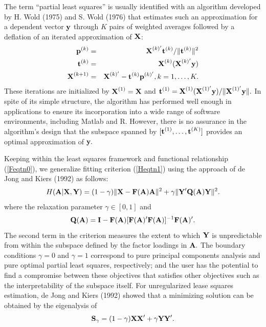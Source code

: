 \documentclass[12pt]{article}
\begin{document}
The term ``partial least squares'' is usually identified with an algorithm developed by H. Wold (1975) and S. Wold (1976) that estimates such an approximation for a dependent vector $\mbox{\bf y}$ through $K$ pairs of weighted averages followed by a deflation of an iterated approximation of $\mbox{\bf X}$:
\begin{eqnarray} \label{PLSeqtns}
  \mbox{\bf p}^{(k)}   & = & \mbox{\bf X}^{(k)'} \mbox{\bf t}^{(k)} / \|\mbox{\bf t}^{(k)}\|^2 \nonumber \\
  \mbox{\bf t}^{(k)}   & = & \mbox{\bf X}^{(k)} (\mbox{\bf X}^{(k)'} \mbox{\bf y})             \nonumber \\
  \mbox{\bf X}^{(k+1)} & = & \mbox{\bf X}^{(k)'} - \mbox{\bf t}^{(k)} \mbox{\bf p}^{(k)'}, k=1, \ldots, K.
\end{eqnarray}
These iterations are initialized by $\mbox{\bf X}^{(1)} = \mbox{\bf X}$ and $\mbox{\bf t}^{(1)} = \mbox{\bf X}^{(1)} (\mbox{\bf X}^{(1)'} \mbox{\bf y}) / \|\mbox{\bf X}^{(1)'}\mbox{\bf y} \|.$  In spite of its simple structure, the algorithm has performed well enough in applications to ensure its incorporation into a wide range of software environments, including Matlab and R.  However, there is no assurance in the algorithm's design that the subspace spanned by $[\mbox{\bf t}^{(1)}, \ldots, \mbox{\bf t}^{(K)}]$ provides an optimal approximation of $\mbox{\bf y}.$

Keeping within the least squares framework and functional relationship (\ref{Feqtn0}), we generalize fitting criterion (\ref{Heqtn1}) using the approach of de Jong and Kiers (1992) as follows:
\begin{equation} \label{HPLSeqtn}
  H(\mbox{\bf A}|\mbox{\bf X}, \mbox{\bf Y}) = (1-\gamma) \|\mbox{\bf X} - \mbox{\bf F}(\mbox{\bf A}) \mbox{\bf A} \|^2 + \gamma \| \mbox{\bf Y}' \mbox{\bf Q}(\mbox{\bf A}) \mbox{\bf Y} \|^2.
\end{equation}
where the relaxation parameter $\gamma \in [0,1]$ and
\begin{equation} \label{Qeqtn}
  \mbox{\bf Q}(\mbox{\bf A}) = \mbox{\bf I} - \mbox{\bf F}(\mbox{\bf A}) [\mbox{\bf F}(\mbox{\bf A})' \mbox{\bf F}(\mbox{\bf A})]^{-1} \mbox{\bf F}(\mbox{\bf A})'.
\end{equation}
The second term in the criterion measures the extent to which $\mbox{\bf Y}$ is unpredictable from within the subspace defined by the factor loadings in $\mbox{\bf A}.$  The boundary conditions $\gamma = 0$ and $\gamma = 1$ correspond to pure principal components analysis and pure optimal partial least squares, respectively; and the user has the potential to find a compromise between these objectives that satisfies other objectives such as the interpretability of the subspace itself.  For unregularized lease squares estimation, de Jong and Kiers (1992) showed that a minimizing solution can be obtained by the eigenalysis of
\begin{equation} \label{Geqtn}
  \mbox{\bf S}_\gamma = (1-\gamma) \mbox{\bf X} \mbox{\bf X}' + \gamma \mbox{\bf Y} \mbox{\bf Y}'.
\end{equation}
\end{document}
